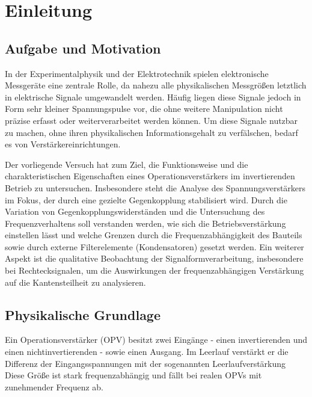 \chapter{Einleitung} \label{ch:Einleitung}

\section{Aufgabe und Motivation}
\label{sec:AuM}

In der Experimentalphysik und der Elektrotechnik spielen elektronische Messgeräte eine zentrale Rolle, da nahezu alle physikalischen Messgrößen letztlich in elektrische Signale umgewandelt werden. Häufig liegen diese Signale jedoch in Form sehr kleiner Spannungspulse vor, die ohne weitere Manipulation nicht präzise erfasst oder weiterverarbeitet werden können. Um diese Signale nutzbar zu machen, ohne ihren physikalischen Informationsgehalt zu verfälschen, bedarf es von Verstärkereinrichtungen.

Der vorliegende Versuch hat zum Ziel, die Funktionsweise und die charakteristischen Eigenschaften eines Operationsverstärkers im invertierenden Betrieb zu untersuchen. Insbesondere steht die Analyse des Spannungsverstärkers im Fokus, der durch eine gezielte Gegenkopplung stabilisiert wird. Durch die Variation von Gegenkopplungswiderständen und die Untersuchung des Frequenzverhaltens soll verstanden werden, wie sich die Betriebsverstärkung einstellen lässt und welche Grenzen durch die Frequenzabhängigkeit des Bauteils sowie durch externe Filterelemente (Kondensatoren) gesetzt werden. Ein weiterer Aspekt ist die qualitative Beobachtung der Signalformverarbeitung, insbesondere bei Rechtecksignalen, um die Auswirkungen der frequenzabhängigen Verstärkung auf die Kantensteilheit zu analysieren.

\section{Physikalische Grundlage}
\label{sec:PhyBasics}

Ein Operationsverstärker (OPV) besitzt zwei Eingänge - einen invertierenden und einen nichtinvertierenden - sowie einen Ausgang. Im Leerlauf verstärkt er die Differenz der Eingangsspannungen mit der sogenannten Leerlaufverstärkung
Diese Größe ist stark frequenzabhängig und fällt bei realen OPVs mit zunehmender Frequenz ab.


